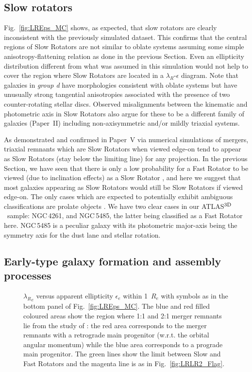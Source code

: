 \documentclass[useAMS,usenatbib,usegraphicx]{mn2e}
\newcommand{\atlas}{{ATLAS$^{\rm 3D}$}}
\begin{document}
\subsection{Slow rotators}

Fig.~\ref{fig:LREps_MC} shows, as expected, that slow rotators are clearly inconsistent
with the previously simulated dataset. This confirms that the central regions of
Slow Rotators are not similar to oblate systems assuming some simple anisotropy-flattening
relation as done in the previous Section. Even an ellipticity distribution different from
what was assumed in this simulation would not help to cover the region 
where Slow Rotators are located in a $\lambda_R$-$\epsilon$ diagram. Note that galaxies in {\em group d}
have morphologies consistent with oblate systems but have unusually strong
tangential anisotropies associated with the presence of two counter-rotating
stellar discs. Observed misalignments between the kinematic and photometric axis
in Slow Rotators also argue for these to be a different family of
galaxies (Paper~II) including non-axisymmetric and/or mildly triaxial systems.

As demonstrated \cite{Jesseit+09} and confirmed in Paper~V
via numerical simulations of mergers, triaxial remnants which are Slow Rotators 
when viewed edge-on tend to appear as Slow Rotators (stay below the limiting line)
for any projection. In the previous Section, we have seen that there is only a
low probability for a Fast Rotator to be viewed (due to inclination effects) as a Slow Rotator
\citep[something also emphasised by][]{Jesseit+09}, and here we suggest that
most galaxies appearing as Slow Rotators would still be Slow Rotators if viewed edge-on.
The only cases which are expected to potentially exhibit ambiguous classifications
are prolate objects \citep{NaabBurkert03,Jesseit+05}. 
We have two clear cases in our \atlas\ sample: NGC\,4261, and NGC\,5485, the
latter being classified as a Fast Rotator here. NGC\,5485 is a peculiar
galaxy with its photometric major-axis being the symmetry axis for the dust lane
and stellar rotation.

\subsection{Early-type galaxy formation and assembly processes}
\label{sec:slow}
\begin{figure}
\centering
{}
\caption{${\lambda_R}_e$ versus apparent ellipticity $\epsilon_e$ within 1~$R_e$ with
symbols as in the bottom panel of Fig.~\ref{fig:LREps_MC}.
The blue and red filled coloured areas show the region where 1:1 and 2:1 merger remnants lie
from the study of \citet{Bois11}: the red area corresponds to the merger remnants with
a retrograde main progenitor (w.r.t. the orbital angular momentum) while the
blue area corresponds to a prograde main progenitor.
The green lines show the limit between Slow and Fast Rotators
and the magenta line is as in Fig.~\ref{fig:LRLR2_Flag}.}
\label{fig:LREps_Mergers}
\end{figure}
\end{document}
